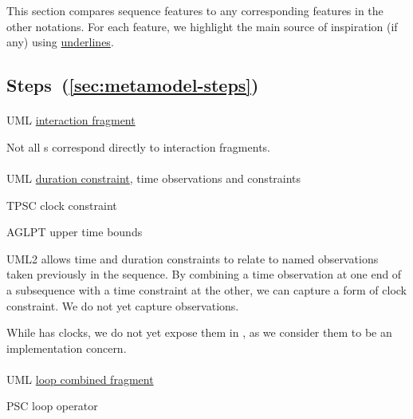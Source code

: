 \newcommand{\insp}[1]{\ul{#1}}

This section compares \langname{} sequence features to any
corresponding features in the other notations.
For each feature, we highlight the main source of inspiration (if any)
using \insp{underlines}.


\subsection{Steps~(\ref{sec:metamodel-steps})}

\paragraph{\msequencestep}
\begin{featset}
\item[UML] \insp{interaction fragment}
\end{featset}

Not all \msequencestep s correspond directly to interaction fragments.

\paragraph{\mdeadlinestep}
\begin{featset}
\item[UML] \insp{duration constraint}, time observations and constraints
\item[TPSC] clock constraint
\item[AGLPT] upper time bounds
\end{featset}

UML2 allows time and duration constraints to relate to named observations taken
previously in the sequence.  By combining a time observation at one end of a
subsequence with a time constraint at the other, we can capture a form of clock
constraint.  We do not yet capture observations.

While \robochart{} has clocks, we do not yet expose them in
\langname, as we consider them to be an implementation concern.

\paragraph{\mloopstep}
\begin{featset}
\item[UML] \insp{loop combined fragment}
\item[PSC] loop operator
\end{featset}

